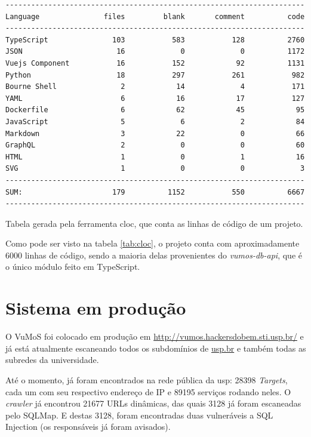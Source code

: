     \clearpage
    \begin{table}[H]
        \begin{verbatim}
----------------------------------------------------------------------
Language               files         blank       comment          code
----------------------------------------------------------------------
TypeScript               103           583           128          2760
JSON                      16             0             0          1172
Vuejs Component           16           152            92          1131
Python                    18           297           261           982
Bourne Shell               2            14             4           171
YAML                       6            16            17           127
Dockerfile                 6            62            45            95
JavaScript                 5             6             2            84
Markdown                   3            22             0            66
GraphQL                    2             0             0            60
HTML                       1             0             1            16
SVG                        1             0             0             3
----------------------------------------------------------------------
SUM:                     179          1152           550          6667
----------------------------------------------------------------------
        \end{verbatim}
        \caption{Tabela gerada pela ferramenta cloc\footnotemark, que conta as linhas de código de um projeto.}
        \label{tab:cloc}
    \end{table}
    
    
    Como pode ser visto na tabela \ref{tab:cloc}, o projeto conta com aproximadamente 6000 linhas de código, sendo a maioria delas provenientes do \textit{vumos-db-api}, que é o único módulo feito em TypeScript.

\section{Sistema em produção}
    O VuMoS foi colocado em produção em \url{http://vumos.hackersdobem.sti.usp.br/} e já está atualmente escaneando todos os subdomínios de \url{usp.br} e também todas as subredes da universidade. 
    
    Até o momento, já foram encontrados na rede pública da usp: 28398 \textit{Targets}, cada um com seu respectivo endereço de IP e 89195 serviços rodando neles. O \textit{crawler} já encontrou 21677 URLs dinâmicas, das quais 3128 já foram escaneadas pelo SQLMap. E destas 3128, foram encontradas duas vulneráveis a SQL Injection (os responsáveis já foram avisados). 

